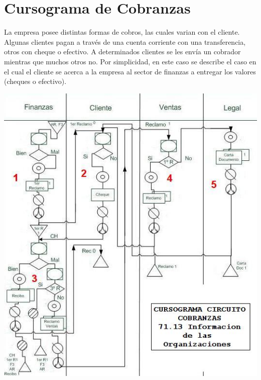 \pagebreak
\section{Cursograma de Cobranzas}
La empresa posee distintas formas de cobros, las cuales varian con el cliente. Algunas clientes pagan a trav\'es de una cuenta corriente con una transferencia, otros con cheque o efectivo. A determinados clientes se les envía un cobrador mientras que muchos otros no.
Por simplicidad, en este caso se describe el caso en el cual el cliente se acerca a la empresa al sector de finanzas a entregar los valores (cheques o efectivo).
\begin{center}
  \includegraphics{Empresa/Circuitos/Cobranzas/cursograma-para-procedimiento-cobranzas.jpg} 
\end{center}

\pagebreak
